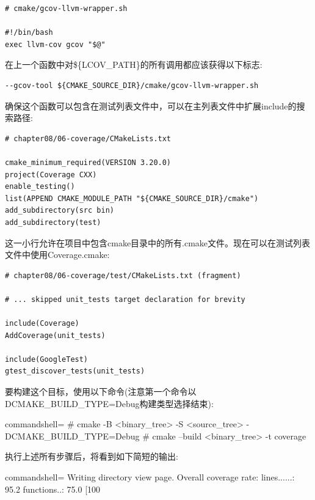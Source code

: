 \begin{lstlisting}[style=stylePython]
# cmake/gcov-llvm-wrapper.sh

#!/bin/bash
exec llvm-cov gcov "$@"
\end{lstlisting}

在上一个函数中对\$\{LCOV\_PATH\}的所有调用都应该获得以下标志:

\begin{lstlisting}[style=stylePython]
--gcov-tool ${CMAKE_SOURCE_DIR}/cmake/gcov-llvm-wrapper.sh
\end{lstlisting}

确保这个函数可以包含在测试列表文件中，可以在主列表文件中扩展include的搜索路径:

\begin{lstlisting}[style=styleCMake]
# chapter08/06-coverage/CMakeLists.txt

cmake_minimum_required(VERSION 3.20.0)
project(Coverage CXX)
enable_testing()
list(APPEND CMAKE_MODULE_PATH "${CMAKE_SOURCE_DIR}/cmake")
add_subdirectory(src bin)
add_subdirectory(test)
\end{lstlisting}

这一小行允许在项目中包含cmake目录中的所有.cmake文件。现在可以在测试列表文件中使用Coverage.cmake:

\begin{lstlisting}[style=styleCMake]
# chapter08/06-coverage/test/CMakeLists.txt (fragment)

# ... skipped unit_tests target declaration for brevity

include(Coverage)
AddCoverage(unit_tests)

include(GoogleTest)
gtest_discover_tests(unit_tests)
\end{lstlisting}

要构建这个目标，使用以下命令(注意第一个命令以DCMAKE\_BUILD\_TYPE=Debug构建类型选择结束):

\begin{tcblisting}{commandshell={}}
# cmake -B <binary_tree> -S <source_tree>
    -DCMAKE_BUILD_TYPE=Debug
# cmake --build <binary_tree> -t coverage
\end{tcblisting}

执行上述所有步骤后，将看到如下简短的输出:

\begin{tcblisting}{commandshell={}}
Writing directory view page.
Overall coverage rate:
  lines......: 95.2%
  functions..: 75.0%
[100%
\end{tcblisting}

